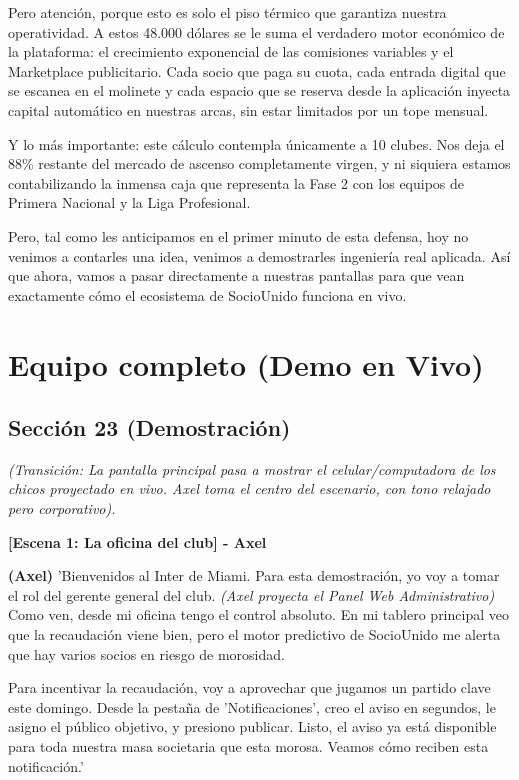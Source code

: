 Pero atención, porque esto es solo el piso térmico que garantiza nuestra operatividad. A estos 48.000 dólares se le suma el verdadero motor económico de la plataforma: el crecimiento exponencial de las comisiones variables y el Marketplace publicitario. Cada socio que paga su cuota, cada entrada digital que se escanea en el molinete y cada espacio que se reserva desde la aplicación inyecta capital automático en nuestras arcas, sin estar limitados por un tope mensual.

Y lo más importante: este cálculo contempla únicamente a 10 clubes. Nos deja el 88\% restante del mercado de ascenso completamente virgen, y ni siquiera estamos contabilizando la inmensa caja que representa la Fase 2 con los equipos de Primera Nacional y la Liga Profesional.

Pero, tal como les anticipamos en el primer minuto de esta defensa, hoy no venimos a contarles una idea, venimos a demostrarles ingeniería real aplicada. Así que ahora, vamos a pasar directamente a nuestras pantallas para que vean exactamente cómo el ecosistema de SocioUnido funciona en vivo.

\newpage

\section{Equipo completo (Demo en Vivo)}

\subsection{Sección 23 (Demostración)}

\textit{(Transición: La pantalla principal pasa a mostrar el celular/computadora de los chicos proyectado en vivo. Axel toma el centro del escenario, con tono relajado pero corporativo).}

\vspace{1cm}

\textbf{[Escena 1: La oficina del club] - Axel}

\textbf{(Axel)}
'Bienvenidos al Inter de Miami. Para esta demostración, yo voy a tomar el rol del gerente general del club. 
\textit{(Axel proyecta el Panel Web Administrativo)} 
Como ven, desde mi oficina tengo el control absoluto. En mi tablero principal veo que la recaudación viene bien, pero el motor predictivo de SocioUnido me alerta que hay varios socios en riesgo de morosidad. 

Para incentivar la recaudación, voy a aprovechar que jugamos un partido clave este domingo. Desde la pestaña de 'Notificaciones', creo el aviso en segundos, le asigno el público objetivo, y presiono publicar. Listo, el aviso ya está disponible para toda nuestra masa societaria que esta morosa. Veamos cómo reciben esta notificación.'

